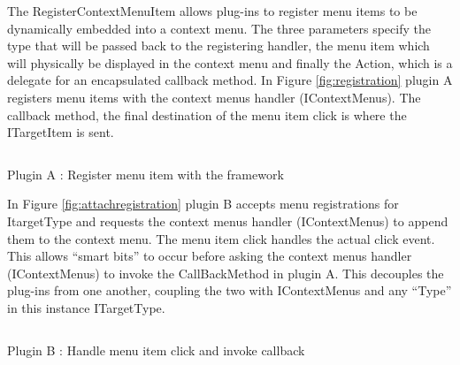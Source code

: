 		
		
		
		
		
		\vspace{3mm}
		\normalsize
		{		
			The RegisterContextMenuItem allows plug-ins to register menu items to be dynamically embedded into a context menu.  The three parameters 
			specify the type that will be passed back to the registering handler, the menu item which will physically be displayed in the context menu and 
			finally the Action, which is a delegate for an encapsulated callback method.
			\newline
			\newline
			In Figure \ref{fig:registration} plugin A registers menu items with the context menus handler (IContextMenus).
			The callback method, the final destination of the menu item click is where the ITargetItem is sent. 
			\newline
		}
			
		\vspace{-2mm}
		\begin{figurehere}
			\inputminted[linenos=true,fontsize=\footnotesize,tabsize=2]{csharp }{pages/chapter3/smippets/registerMenuItem}
			\caption{Plugin A : Register menu item with the framework}
			\label{fig:registration}
		\end{figurehere}
			
		\vspace{3mm}
		\normalsize
		{
			In Figure \ref{fig:attachregistration} plugin B accepts menu registrations for ItargetType and requests the 
			context menus handler (IContextMenus) to append them to the context menu. The menu item click handles the actual click event.
			This allows ``smart bits'' to occur before asking the context menus handler (IContextMenus) to invoke the CallBackMethod in plugin A.
			This decouples the plug-ins from one another, coupling the two with IContextMenus and any ``Type'' in this instance ITargetType.
			\newline
		}	
					
			
		\begin{figurehere}
			\inputminted[linenos=true,fontsize=\footnotesize,tabsize=2]{csharp}{pages/chapter3/smippets/contextOpeningEvent}
			\vspace{-2mm}
			\caption{Plugin B : Handle menu item click and invoke callback}
			\label{fig:attachregistration}
		\end{figurehere}			
			

		
		

